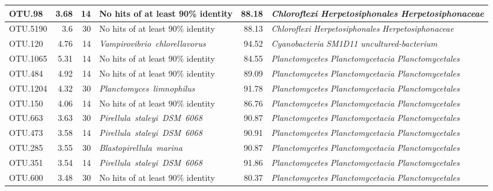 \begin{ThreePartTable}
\begin{longtable}{lrrP{5cm}rP{5cm}}
OTU.98 & 3.68 & 14 & {No hits of at least 90\% identity} & 88.18 & \mbox{\textit{Chloroflexi}} \mbox{\textit{Herpetosiphonales}} \mbox{\textit{Herpetosiphonaceae}} \\ \midrule
OTU.5190 & 3.6 & 30 & {No hits of at least 90\% identity} & 88.13 & \mbox{\textit{Chloroflexi}} \mbox{\textit{Herpetosiphonales}} \mbox{\textit{Herpetosiphonaceae}} \\ \midrule
OTU.120 & 4.76 & 14 & \mbox{\textit{Vampirovibrio chlorellavorus}} & 94.52 & \mbox{\textit{Cyanobacteria}} \mbox{\textit{SM1D11}} \mbox{\textit{uncultured-bacterium}} \\ \midrule
OTU.1065 & 5.31 & 14 & {No hits of at least 90\% identity} & 84.55 & \mbox{\textit{Planctomycetes}} \mbox{\textit{Planctomycetacia}} \mbox{\textit{Planctomycetales}} \\ \midrule
OTU.484 & 4.92 & 14 & {No hits of at least 90\% identity} & 89.09 & \mbox{\textit{Planctomycetes}} \mbox{\textit{Planctomycetacia}} \mbox{\textit{Planctomycetales}} \\ \midrule
OTU.1204 & 4.32 & 30 & \mbox{\textit{Planctomyces limnophilus}} & 91.78 & \mbox{\textit{Planctomycetes}} \mbox{\textit{Planctomycetacia}} \mbox{\textit{Planctomycetales}} \\ \midrule
OTU.150 & 4.06 & 14 & {No hits of at least 90\% identity} & 86.76 & \mbox{\textit{Planctomycetes}} \mbox{\textit{Planctomycetacia}} \mbox{\textit{Planctomycetales}} \\ \midrule
OTU.663 & 3.63 & 30 & \mbox{\textit{Pirellula staleyi DSM 6068}} & 90.87 & \mbox{\textit{Planctomycetes}} \mbox{\textit{Planctomycetacia}} \mbox{\textit{Planctomycetales}} \\ \midrule
OTU.473 & 3.58 & 14 & \mbox{\textit{Pirellula staleyi DSM 6068}} & 90.91 & \mbox{\textit{Planctomycetes}} \mbox{\textit{Planctomycetacia}} \mbox{\textit{Planctomycetales}} \\ \midrule
OTU.285 & 3.55 & 30 & \mbox{\textit{Blastopirellula marina}} & 90.87 & \mbox{\textit{Planctomycetes}} \mbox{\textit{Planctomycetacia}} \mbox{\textit{Planctomycetales}} \\ \midrule
OTU.351 & 3.54 & 14 & \mbox{\textit{Pirellula staleyi DSM 6068}} & 91.86 & \mbox{\textit{Planctomycetes}} \mbox{\textit{Planctomycetacia}} \mbox{\textit{Planctomycetales}} \\ \midrule
OTU.600 & 3.48 & 30 & {No hits of at least 90\% identity} & 80.37 & \mbox{\textit{Planctomycetes}} \mbox{\textit{Planctomycetacia}} \mbox{\textit{Planctomycetales}} \\ \midrule

\end{longtable}
\end{ThreePartTable}
